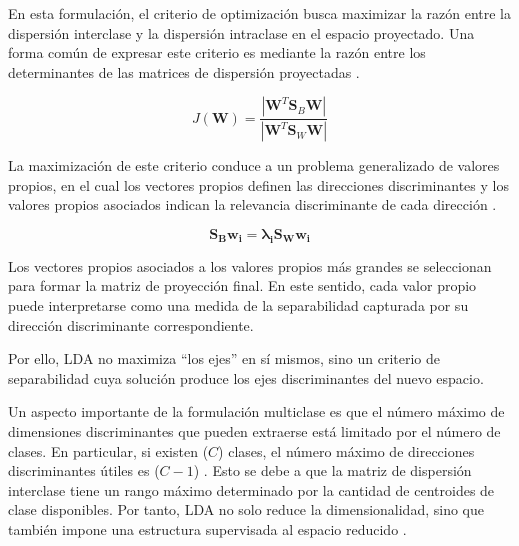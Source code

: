 En esta formulación, el criterio de optimización busca maximizar la razón entre la dispersión interclase y la dispersión intraclase en el espacio proyectado. Una forma común de expresar este criterio es mediante la razón entre los determinantes de las matrices de dispersión proyectadas \cite{fukunaga2013introduction}.

\begin{equation}
	J(\mathbf{W}) = \frac{|\mathbf{W}^T \mathbf{S}_B \mathbf{W}|}{|\mathbf{W}^T \mathbf{S}_W \mathbf{W}|}
	\label{eq:EMT6}
\end{equation}

La maximización de este criterio conduce a un problema generalizado de valores propios, en el cual los vectores propios definen las direcciones discriminantes y los valores propios asociados indican la relevancia discriminante de cada dirección \cite{martinez2001pca}.

\begin{equation}
	\mathbf{S_Bw_i = \lambda_iS_Ww_i}
	\label{eq:EMT7}
\end{equation}

Los vectores propios asociados a los valores propios más grandes se seleccionan para formar la matriz de proyección final. En este sentido, cada valor propio puede interpretarse como una medida de la separabilidad capturada por su dirección discriminante correspondiente.

Por ello, LDA no maximiza “los ejes” en sí mismos, sino un criterio de separabilidad cuya solución produce los ejes discriminantes del nuevo espacio.





Un aspecto importante de la formulación multiclase es que el número máximo de dimensiones discriminantes que pueden extraerse está limitado por el número de clases. En particular, si existen ($C$) clases, el número máximo de direcciones discriminantes útiles es ($C-1$) \cite{duda2000pattern}. Esto se debe a que la matriz de dispersión interclase tiene un rango máximo determinado por la cantidad de centroides de clase disponibles. Por tanto, LDA no solo reduce la dimensionalidad, sino que también impone una estructura supervisada al espacio reducido \cite{belhumeur1997eigenfaces}.

